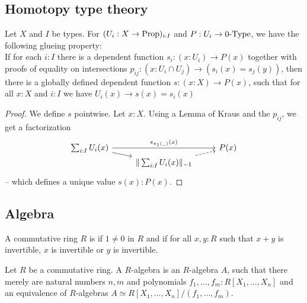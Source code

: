 \subsection{Homotopy type theory}

\begin{lemma}%
  \label{lem:kraus-glueing}
  Let $X$ and $I$ be types.
  For $(U_i:X \to \mathrm{Prop})_{i:I}$ and $P:U_i\to 0\mbox{-}\mathrm{Type}$, we have the following glueing property: \\
  If for each $i:I$ there is a dependent function $s_i:(x:U_i)\to P(x)$ together with
  proofs of equality on intersections $p_{ij}:(x:U_i\cap U_j)\to (s_i(x)=s_j(y))$,
  then there is a globally defined dependent function $s:(x:X) \to P(x)$,
  such that for all $x:X$ and $i:I$ we have $U_i(x) \to s(x)=s_i(x)$
\end{lemma}

\begin{proof}
  We define $s$ pointwise.
  Let $x:X$.
  Using a Lemma of Kraus and the $p_{ij}$, we get a factorization
  \[ \begin{tikzcd}[row sep=0mm]
    \sum_{i:I} U_i(x) \ar[rr, "s_{\pi_1(\_)}(x)"]\ar[rd] & & P(x) \\
    & \|\sum_{i:I} U_i(x)\|_{-1}\ar[ru,dashed] &
  \end{tikzcd} \]
-- which defines a unique value $s(x):P(x)$.
\end{proof}

\subsection{Algebra}

\begin{definition}
  A commutative ring $R$ is  if $1\neq 0$ in $R$ and
  if for all $x,y:R$ such that $x+y$ is invertible, $x$ is invertible or $y$ is invertible.
\end{definition}

\begin{definition}
  Let $R$ be a commutative ring.
  A  $R$-algebra is an $R$-algebra $A$,
  such that there merely are natural numbers $n,m$ and polynomials $f_1,\dots,f_m:R[X_1,\dots,X_n]$
  and an equivalence of $R$-algebras $A\simeq R[X_1,\dots,X_n]/(f_1,\dots,f_m)$.
\end{definition}

